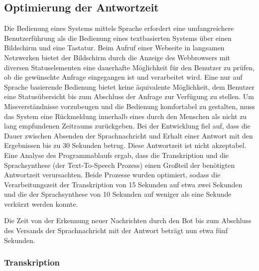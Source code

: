 \subsection{Optimierung der Antwortzeit}

Die Bedienung eines Systems mittels Sprache erfordert eine umfangreichere Benutzerführung als die Bedienung eines textbasierten Systems über einen Bildschirm und eine Tastatur. Beim Aufruf einer Webseite in langsamen Netzwerken bietet der Bildschirm durch die Anzeige des Webbrowsers mit diversen Statuselementen eine dauerhafte Möglichkeit für den Benutzer zu prüfen, ob die gewünschte Anfrage eingegangen ist und verarbeitet wird. Eine nur auf Sprache basierende Bedienung bietet keine äquivalente Möglichkeit, dem Benutzer eine Statusübersicht bis zum Abschluss der Anfrage zur Verfügung zu stellen. Um Missverständnisse vorzubeugen und die Bedienung komfortabel zu gestalten, muss das System eine Rückmeldung innerhalb eines durch den Menschen als nicht zu lang empfundenen Zeitraums zurückgeben. Bei der Entwicklung fiel auf, dass die Dauer zwischen Absenden der Sprachnachricht und Erhalt einer Antwort mit den Ergebnissen bis zu 30 Sekunden betrug. Diese Antwortzeit ist nicht akzeptabel. Eine Analyse des Programmablaufs ergab, dass die Transkription und die Sprachsynthese (der Text-To-Speech Prozess) einen Großteil der benötigten Antwortzeit verursachten. Beide Prozesse wurden optimiert, sodass die Verarbeitungszeit der Transkription von 15 Sekunden auf etwa zwei Sekunden und die der Sprachsynthese von 10 Sekunden auf weniger als eine Sekunde verkürzt werden konnte.

Die Zeit von der Erkennung neuer Nachrichten durch den Bot bis zum Abschluss des Versands der Sprachnachricht mit der Antwort beträgt nun etwa fünf Sekunden.

\subsubsection{Transkription}

